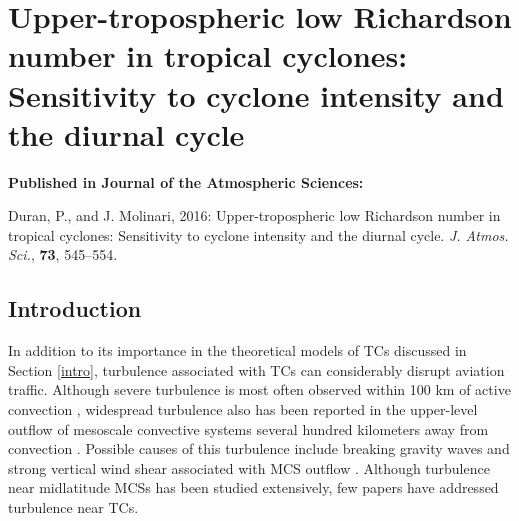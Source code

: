  
\chapter{Upper-tropospheric low Richardson number in tropical cyclones: Sensitivity to cyclone intensity and the diurnal cycle}
\resetfootnote %

\textbf{Published in Journal of the Atmospheric Sciences:}

\noindent Duran, P., and J. Molinari, 2016: Upper-tropospheric low Richardson number in tropical cyclones: Sensitivity to cyclone intensity and the diurnal cycle. \textit{J. Atmos. Sci.}, \textbf{73}, 545–554.


\section{Introduction}

In addition to its importance in the theoretical models of TCs discussed in Section \ref{intro}, turbulence associated with TCs can considerably disrupt aviation traffic.
Although severe turbulence is most often observed within 100 km of active convection \citep{Laneetal2012}, widespread turbulence also has been reported in the upper-level outflow of mesoscale convective systems several hundred kilometers away from convection \citep{TrierSharman2009}.
Possible causes of this turbulence include breaking gravity waves \citep{Laneetal2012} and strong vertical wind shear associated with MCS outflow \citep{Zovko-RajakLane2014}.
Although turbulence near midlatitude MCSs has been studied extensively, few papers have addressed turbulence near TCs.

